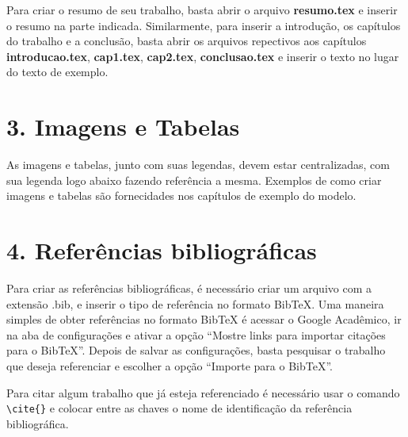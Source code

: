 \documentclass[a4paper, 12pt]{report}
\begin{document}
Para criar o resumo de seu trabalho, basta abrir o arquivo {\bfseries resumo.tex} e inserir o resumo na 
parte indicada. Similarmente, para inserir a introdução, os capítulos do trabalho e a conclusão, basta 
abrir os arquivos 
repectivos aos capítulos {\bfseries introducao.tex}, {\bfseries cap1.tex}, {\bfseries cap2.tex}, {\bfseries 
conclusao.tex} e inserir o texto no lugar do texto de exemplo.

\section*{3. Imagens e Tabelas}

As imagens e tabelas, junto com suas legendas, devem estar centralizadas, com sua legenda logo abaixo 
fazendo referência a mesma. Exemplos de como criar imagens e tabelas são fornecidades nos capítulos de 
exemplo do modelo.

\section*{4. Referências bibliográficas}

Para criar as referências bibliográficas, é necessário criar um arquivo com a extensão .bib, e inserir o 
tipo de referência no formato BibTeX. Uma maneira simples de obter referências no formato BibTeX é acessar 
o Google Acadêmico\cite{GOOG}, ir na aba de configurações e ativar a opção ``Mostre links para importar 
citações para o BibTeX''. Depois de salvar as configurações, basta pesquisar o trabalho que deseja 
referenciar e escolher a opção ``Importe para o BibTeX''.

Para citar algum trabalho que já esteja referenciado é necessário usar o comando 
\lstinline[breaklines=true]!\cite{}! e colocar entre as chaves o nome de identificação da referência 
bibliográfica.


  
  
\end{document}
